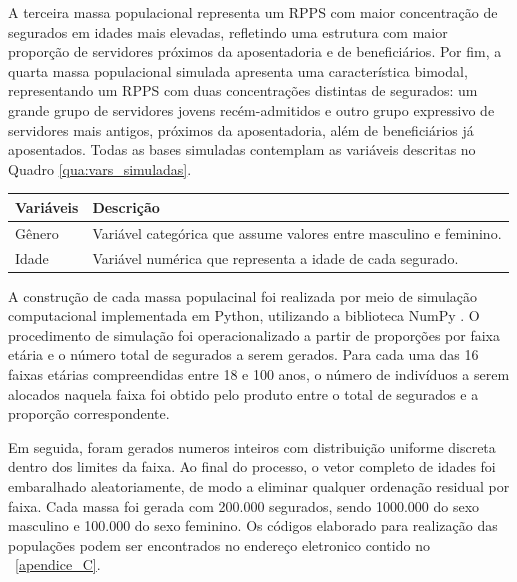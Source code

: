 A terceira massa populacional representa um RPPS com maior concentração de segurados em idades mais elevadas, refletindo uma estrutura com maior proporção de servidores próximos da aposentadoria e de beneficiários. Por fim, a quarta massa populacional simulada apresenta uma característica bimodal, representando um RPPS com duas concentrações distintas de segurados: um grande grupo de servidores jovens recém-admitidos e outro grupo expressivo de servidores mais antigos, próximos da aposentadoria, além de beneficiários já aposentados. Todas as bases simuladas contemplam as variáveis descritas no Quadro \ref{qua:vars_simuladas}.

\vspace{0.5cm}

\begin{quadro}[htbp]
    \centering
    \small
    \caption{Descrição das Variáveis Simuladas}
    \label{qua:vars_simuladas}
    \begin{tabularx}{\textwidth}{|l|>{\raggedright\arraybackslash}X|} 
        \hline
        \textbf{Variáveis} & \textbf{Descrição} \\
        \hline
        Gênero & Variável categórica que assume valores entre masculino e feminino. \\
        \hline
        Idade & Variável numérica que representa a idade de cada segurado. \\
        \hline
    \end{tabularx}
\end{quadro}

A construção de cada massa populacinal foi realizada por meio de simulação computacional implementada em Python, utilizando a biblioteca NumPy \cite{numpy2020}. O procedimento de simulação foi operacionalizado a partir de proporções por faixa etária e o número total de segurados a serem gerados. Para cada uma das 16 faixas etárias compreendidas entre 18 e 100 anos, o número de indivíduos a serem alocados naquela faixa foi obtido pelo produto entre o total de segurados e a proporção correspondente.

Em seguida, foram gerados numeros inteiros com distribuição uniforme discreta dentro dos limites da faixa. Ao final do processo, o vetor completo de idades foi embaralhado aleatoriamente, de modo a eliminar qualquer ordenação residual por faixa. Cada massa foi gerada com 200.000 segurados, sendo 1000.000 do sexo masculino e 100.000 do sexo feminino. Os códigos elaborado para realização das populações podem ser encontrados no endereço eletronico contido no ~\ref{apendice_C}.

